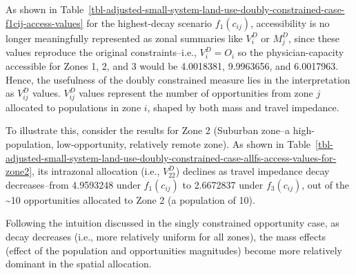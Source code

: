 \documentclass[
  10pt,
  letterpaper,
]{article}
\begin{document}
As shown in
Table~\ref{tbl-adjusted-small-system-land-use-doubly-constrained-case-f1cij-access-values}
for the highest-decay scenario \(f_1(c_{ij})\), accessibility is no
longer meaningfully represented as zonal summaries like \(V^D_i\) or
\(M^D_j\), since these values reproduce the original constraints--i.e.,
\(V^D_i = O_i\) so the physician-capacity accessible for Zones 1, 2, and
3 would be 4.0018381, 9.9963656, and 6.0017963. Hence, the usefulness of
the doubly constrained measure lies in the interpretation as
\(V_{ij}^D\) values. \(V^D_{ij}\) values represent the number of
opportunities from zone \(j\) allocated to populations in zone \(i\),
shaped by both mass and travel impedance.

To illustrate this, consider the results for Zone 2 (Suburban zone--a
high-population, low-opportunity, relatively remote zone). As shown in
Table~\ref{tbl-adjusted-small-system-land-use-doubly-constrained-case-allfs-access-values-for-zone2},
its intrazonal allocation (i.e., \(V^D_{22}\)) declines as travel
impedance decay decreases--from 4.9593248 under \(f_1(c_{ij})\) to
2.6672837 under \(f_3(c_{ij})\), out of the \textasciitilde10
opportunities allocated to Zone 2 (a population of 10).

Following the intuition discussed in the singly constrained opportunity
case, as decay decreases (i.e., more relatively uniform for all zones),
the mass effects (effect of the population and opportunities magnitudes)
become more relatively dominant in the spatial allocation.
\end{document}
